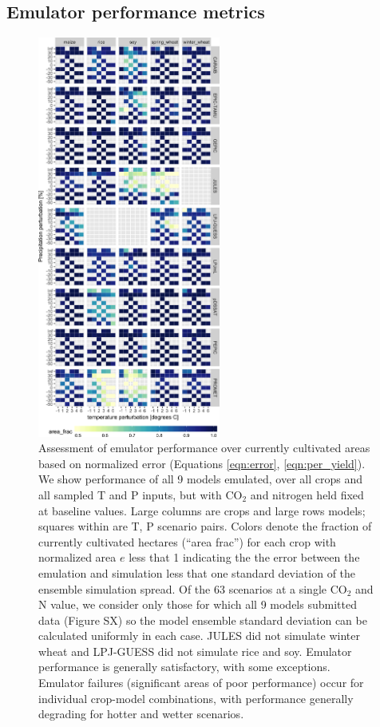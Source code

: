 \documentclass[gmd, manuscript]{copernicus} %
\begin{document}
\subsection{Emulator performance metrics}
\begin{figure}[ht]
\centering
    \includegraphics[width=6cm]{figures/error_360.png}
    \caption{Assessment of emulator performance over currently cultivated areas based on normalized error (Equations \ref{eqn:error}, \ref{eqn:per_yield}). 
    We show performance of all 9 models emulated, over all crops and all sampled T and P inputs, but with CO$_2$ and nitrogen held fixed at baseline values. 
    Large columns are crops and large rows models; squares within are T, P scenario pairs. 
    Colors denote the fraction of currently cultivated hectares (``area frac'') for each crop with normalized area $e$ less that 1 indicating the the error between the emulation and simulation less that one standard deviation of the ensemble simulation spread. 
    Of the 63 scenarios at a single CO$_2$ and N value, we consider only those for which all 9 models submitted data (Figure SX) so the model ensemble standard deviation can be calculated uniformly in each case. 
    JULES did not simulate winter wheat and LPJ-GUESS did not simulate rice and soy. Emulator performance is generally satisfactory, with some exceptions. 
    Emulator failures (significant areas of poor performance) occur for individual crop-model combinations, with performance generally degrading for hotter and wetter scenarios.}
   \label{fig:error_360}
\end{figure}
\end{document}
